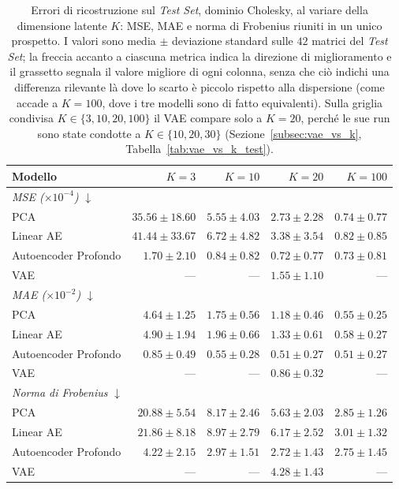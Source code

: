 \begin{table}[htbp]
\centering
\small
\setlength{\tabcolsep}{4pt}
\begin{tabular}{lrrrr}
\hline
\textbf{Modello} & $K=3$ & $K=10$ & $K=20$ & $K=100$ \\
\hline
\multicolumn{5}{l}{\textit{MSE ($\times 10^{-4}$)} $\downarrow$} \\
PCA & $35.56 \pm 18.60$ & $5.55 \pm 4.03$ & $2.73 \pm 2.28$ & $0.74 \pm 0.77$ \\
Linear AE & $41.44 \pm 33.67$ & $6.72 \pm 4.82$ & $3.38 \pm 3.54$ & $0.82 \pm 0.85$ \\
Autoencoder Profondo & $\mathbf{1.70 \pm 2.10}$ & $\mathbf{0.84 \pm 0.82}$ & $\mathbf{0.72 \pm 0.77}$ & $\mathbf{0.73 \pm 0.81}$ \\
VAE & --- & --- & $1.55 \pm 1.10$ & --- \\
\hline
\multicolumn{5}{l}{\textit{MAE ($\times 10^{-2}$)} $\downarrow$} \\
PCA & $4.64 \pm 1.25$ & $1.75 \pm 0.56$ & $1.18 \pm 0.46$ & $0.55 \pm 0.25$ \\
Linear AE & $4.90 \pm 1.94$ & $1.96 \pm 0.66$ & $1.33 \pm 0.61$ & $0.58 \pm 0.27$ \\
Autoencoder Profondo & $\mathbf{0.85 \pm 0.49}$ & $\mathbf{0.55 \pm 0.28}$ & $\mathbf{0.51 \pm 0.27}$ & $\mathbf{0.51 \pm 0.27}$ \\
VAE & --- & --- & $0.86 \pm 0.32$ & --- \\
\hline
\multicolumn{5}{l}{\textit{Norma di Frobenius} $\downarrow$} \\
PCA & $20.88 \pm 5.54$ & $8.17 \pm 2.46$ & $5.63 \pm 2.03$ & $2.85 \pm 1.26$ \\
Linear AE & $21.86 \pm 8.18$ & $8.97 \pm 2.79$ & $6.17 \pm 2.52$ & $3.01 \pm 1.32$ \\
Autoencoder Profondo & $\mathbf{4.22 \pm 2.15}$ & $\mathbf{2.97 \pm 1.51}$ & $\mathbf{2.72 \pm 1.43}$ & $\mathbf{2.75 \pm 1.45}$ \\
VAE & --- & --- & $4.28 \pm 1.43$ & --- \\
\hline
\end{tabular}
\caption{Errori di ricostruzione sul \emph{Test Set}, dominio Cholesky, al variare della dimensione latente $K$: MSE, MAE e norma di Frobenius riuniti in un unico prospetto. I valori sono media $\pm$ deviazione standard sulle $42$ matrici del \emph{Test Set}; la freccia accanto a ciascuna metrica indica la direzione di miglioramento e il grassetto segnala il valore migliore di ogni colonna, senza che ciò indichi una differenza rilevante là dove lo scarto è piccolo rispetto alla dispersione (come accade a $K=100$, dove i tre modelli sono di fatto equivalenti). Sulla griglia condivisa $K\in\{3,10,20,100\}$ il VAE compare solo a $K=20$, perché le sue run sono state condotte a $K\in\{10,20,30\}$ (Sezione~\ref{subsec:vae_vs_k}, Tabella~\ref{tab:vae_vs_k_test}).}
\label{tab:err_test_cholesky}
\end{table}

